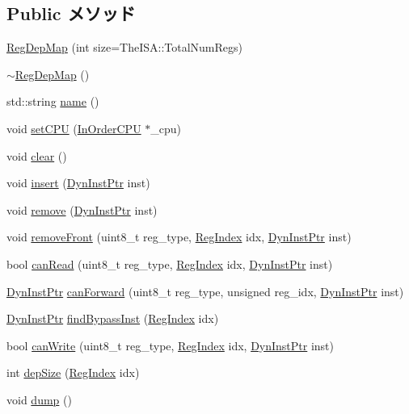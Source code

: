 \subsection*{Public メソッド}
\begin{DoxyCompactItemize}
\item 
\hyperlink{classRegDepMap_a740eadbb74c2858768d7fa7e32e5cafb}{RegDepMap} (int size=TheISA::TotalNumRegs)
\item 
\hyperlink{classRegDepMap_abdbd8b917a4492cf43256c3962f97cb3}{$\sim$RegDepMap} ()
\item 
std::string \hyperlink{classRegDepMap_aa62b508d2c0e7d9cec12924965276eb5}{name} ()
\item 
void \hyperlink{classRegDepMap_ad9f94f552b2c6a5daf605771891e76e7}{setCPU} (\hyperlink{classInOrderCPU}{InOrderCPU} $\ast$\_\-cpu)
\item 
void \hyperlink{classRegDepMap_ac8bb3912a3ce86b15842e79d0b421204}{clear} ()
\item 
void \hyperlink{classRegDepMap_ae55039f80e321715cf410a62b39d069c}{insert} (\hyperlink{classRefCountingPtr}{DynInstPtr} inst)
\item 
void \hyperlink{classRegDepMap_a21558187a079b60fba92c9c66725f051}{remove} (\hyperlink{classRefCountingPtr}{DynInstPtr} inst)
\item 
void \hyperlink{classRegDepMap_a40cf3c335b8ecc0c33de75fe822f25f7}{removeFront} (uint8\_\-t reg\_\-type, \hyperlink{classRegDepMap_a36d25e03e43fa3bb4c5482cbefe5e0fb}{RegIndex} idx, \hyperlink{classRefCountingPtr}{DynInstPtr} inst)
\item 
bool \hyperlink{classRegDepMap_ae8b9c354b5aeebf986113ee06b6284bd}{canRead} (uint8\_\-t reg\_\-type, \hyperlink{classRegDepMap_a36d25e03e43fa3bb4c5482cbefe5e0fb}{RegIndex} idx, \hyperlink{classRefCountingPtr}{DynInstPtr} inst)
\item 
\hyperlink{classRefCountingPtr}{DynInstPtr} \hyperlink{classRegDepMap_a700524c6365911232dd3afe88da67f0a}{canForward} (uint8\_\-t reg\_\-type, unsigned reg\_\-idx, \hyperlink{classRefCountingPtr}{DynInstPtr} inst)
\item 
\hyperlink{classRefCountingPtr}{DynInstPtr} \hyperlink{classRegDepMap_a7f3dc7ca520ca37039329e5a63b2594a}{findBypassInst} (\hyperlink{classRegDepMap_a36d25e03e43fa3bb4c5482cbefe5e0fb}{RegIndex} idx)
\item 
bool \hyperlink{classRegDepMap_a461ac3944ef0b39fb9ef9eb94421ea84}{canWrite} (uint8\_\-t reg\_\-type, \hyperlink{classRegDepMap_a36d25e03e43fa3bb4c5482cbefe5e0fb}{RegIndex} idx, \hyperlink{classRefCountingPtr}{DynInstPtr} inst)
\item 
int \hyperlink{classRegDepMap_ab532dbca982a8cc2a418fdc6e36d3d87}{depSize} (\hyperlink{classRegDepMap_a36d25e03e43fa3bb4c5482cbefe5e0fb}{RegIndex} idx)
\item 
void \hyperlink{classRegDepMap_accd2600060dbaee3a3b41aed4034c63c}{dump} ()
\end{DoxyCompactItemize}
